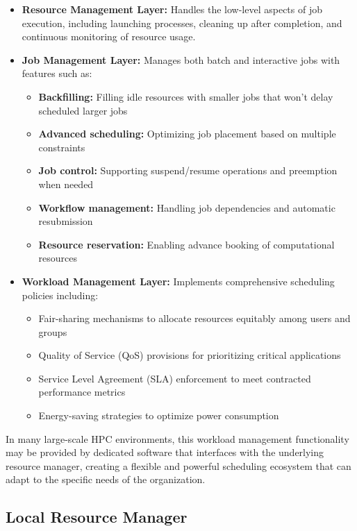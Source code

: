 \begin{itemize}
    \item \textbf{Resource Management Layer:} Handles the low-level aspects of job execution, including launching processes, cleaning up after completion, and continuous monitoring of resource usage.
    
    \item \textbf{Job Management Layer:} Manages both batch and interactive jobs with features such as:
    \begin{itemize}
        \item \textbf{Backfilling:} Filling idle resources with smaller jobs that won't delay scheduled larger jobs
        \item \textbf{Advanced scheduling:} Optimizing job placement based on multiple constraints
        \item \textbf{Job control:} Supporting suspend/resume operations and preemption when needed
        \item \textbf{Workflow management:} Handling job dependencies and automatic resubmission
        \item \textbf{Resource reservation:} Enabling advance booking of computational resources
    \end{itemize}
    
    \item \textbf{Workload Management Layer:} Implements comprehensive scheduling policies including:
    \begin{itemize}
        \item Fair-sharing mechanisms to allocate resources equitably among users and groups
        \item Quality of Service (QoS) provisions for prioritizing critical applications
        \item Service Level Agreement (SLA) enforcement to meet contracted performance metrics
        \item Energy-saving strategies to optimize power consumption
    \end{itemize}
\end{itemize}

In many large-scale HPC environments, this workload management functionality may be provided by dedicated software that interfaces with the underlying resource manager, creating a flexible and powerful scheduling ecosystem that can adapt to the specific needs of the organization.

\subsection{Local Resource Manager}

